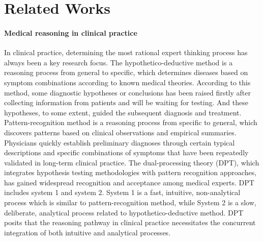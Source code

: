 \section{Related Works}
\paragraph{Medical reasoning in clinical practice} In clinical practice, determining the most rational expert thinking process has always been a key research focus\cite{norman2005research,higgs2008clinical,adams2013clinical,schwartz2008clinical,schmidt1990cognitive}. The hypothetico-deductive method\cite{elstein1990medical,patel1986knowledge,higgs1992developing} is a reasoning process from general to specific, which determines diseases based on symptom combinations according to known medical theories. According to this method, some diagnostic hypotheses or conclusions has been raised firstly after collecting information from patients and will be waiting for testing. And these hypotheses, to some extent, guided the subsequent diagnosis and treatment. Pattern-recognition method\cite{barrows1987clinical,case1988evaluating} is a reasoning process from specific to general, which discovers patterns based on clinical observations and empirical summaries. Physicians quickly establish preliminary diagnoses through certain typical descriptions and specific combinations of symptoms that have been repeatedly validated in long-term clinical practice. The dual-processing theory (DPT)\cite{epstein1994integration,hammond2000human}, which integrates hypothesis testing methodologies with pattern recognition approaches, has gained widespread recognition and acceptance among medical experts. DPT includes system 1 and system 2\cite{evans2008dual}.  System 1 is a fast, intuitive, non-analytical process which is similar to pattern-recognition method, while System 2 is a slow, deliberate, analytical process related to hypothetico-deductive method\cite{higgs2008clinical,pelaccia2011analysis}. DPT posits that the reasoning pathway in clinical practice necessitates the concurrent integration of both intuitive and analytical processes\cite{evans2008dual,kahneman2011thinking,evans2013dual}.

